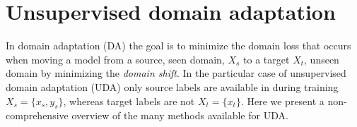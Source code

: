 \section{Unsupervised domain adaptation}
In domain adaptation (DA) the goal is to minimize the domain loss that occurs when moving a model from a source, seen domain, $X_s$ to a target $X_t$, unseen domain by minimizing the \emph{domain shift}. In the particular case of unsupervised domain adaptation (UDA) only source labels are available in during training $X_s=\{x_s,y_s\}$, whereas target labels are not $X_t=\{x_t\}$. Here we present a non-comprehensive overview of the many methods available for UDA.

% 